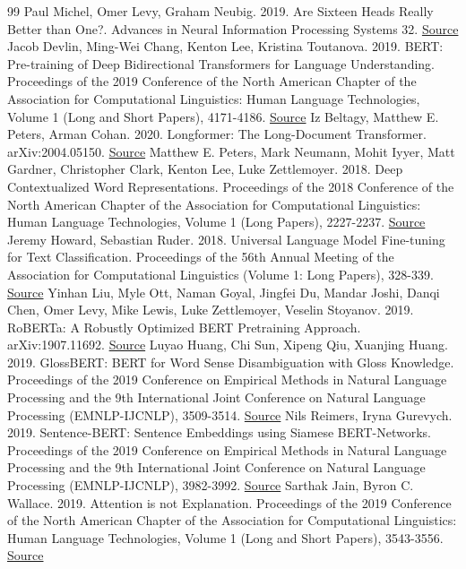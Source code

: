 \documentclass[10pt,letterpaper]{article}
\begin{document}
\begin{thebibliography}{99}
Paul Michel, Omer Levy, Graham Neubig. 2019. Are Sixteen Heads Really Better than One?. Advances in Neural Information Processing Systems 32. \href{https://arxiv.org/abs/1905.10650}{Source}
Jacob Devlin, Ming-Wei Chang, Kenton Lee, Kristina Toutanova. 2019. BERT: Pre-training of Deep Bidirectional Transformers for Language Understanding. Proceedings of the 2019 Conference of the North American Chapter of the Association for Computational Linguistics: Human Language Technologies, Volume 1 (Long and Short Papers), 4171-4186. \href{https://aclanthology.org/N19-1423/}{Source}
Iz Beltagy, Matthew E. Peters, Arman Cohan. 2020. Longformer: The Long-Document Transformer. arXiv:2004.05150. \href{https://arxiv.org/abs/2004.05150}{Source}
Matthew E. Peters, Mark Neumann, Mohit Iyyer, Matt Gardner, Christopher Clark, Kenton Lee, Luke Zettlemoyer. 2018. Deep Contextualized Word Representations. Proceedings of the 2018 Conference of the North American Chapter of the Association for Computational Linguistics: Human Language Technologies, Volume 1 (Long Papers), 2227-2237. \href{https://aclanthology.org/N18-1202/}{Source}
Jeremy Howard, Sebastian Ruder. 2018. Universal Language Model Fine-tuning for Text Classification. Proceedings of the 56th Annual Meeting of the Association for Computational Linguistics (Volume 1: Long Papers), 328-339. \href{https://aclanthology.org/P18-1031/}{Source}
Yinhan Liu, Myle Ott, Naman Goyal, Jingfei Du, Mandar Joshi, Danqi Chen, Omer Levy, Mike Lewis, Luke Zettlemoyer, Veselin Stoyanov. 2019. RoBERTa: A Robustly Optimized BERT Pretraining Approach. arXiv:1907.11692. \href{https://arxiv.org/abs/1907.11692}{Source}
Luyao Huang, Chi Sun, Xipeng Qiu, Xuanjing Huang. 2019. GlossBERT: BERT for Word Sense Disambiguation with Gloss Knowledge. Proceedings of the 2019 Conference on Empirical Methods in Natural Language Processing and the 9th International Joint Conference on Natural Language Processing (EMNLP-IJCNLP), 3509-3514. \href{https://aclanthology.org/D19-1355/}{Source}
Nils Reimers, Iryna Gurevych. 2019. Sentence-BERT: Sentence Embeddings using Siamese BERT-Networks. Proceedings of the 2019 Conference on Empirical Methods in Natural Language Processing and the 9th International Joint Conference on Natural Language Processing (EMNLP-IJCNLP), 3982-3992. \href{https://aclanthology.org/D19-1410/}{Source}
Sarthak Jain, Byron C. Wallace. 2019. Attention is not Explanation. Proceedings of the 2019 Conference of the North American Chapter of the Association for Computational Linguistics: Human Language Technologies, Volume 1 (Long and Short Papers), 3543-3556. \href{https://aclanthology.org/N19-1357/}{Source}

\end{thebibliography}
\end{document}
